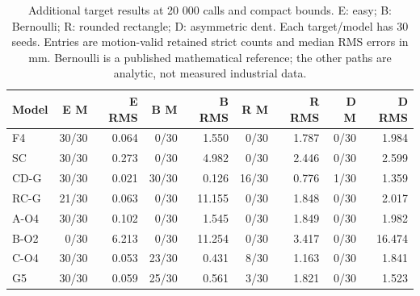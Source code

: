 \begin{table}[H]
\caption{Additional target results at 20 000 calls and compact bounds. E: easy; B: Bernoulli; R: rounded rectangle; D: asymmetric dent. Each target/model has 30 seeds. Entries are motion-valid retained strict counts and median RMS errors in mm. Bernoulli is a published mathematical reference; the other paths are analytic, not measured industrial data.}
\label{tab:v2_targets}
\centering
\small
\begin{tabular}{@{}lrrrrrrrr@{}}
\toprule
Model & E M & E RMS & B M & B RMS & R M & R RMS & D M & D RMS \\
\midrule
F4 & 30/30 & 0.064 & 0/30 & 1.550 & 0/30 & 1.787 & 0/30 & 1.984 \\
SC & 30/30 & 0.273 & 0/30 & 4.982 & 0/30 & 2.446 & 0/30 & 2.599 \\
CD-G & 30/30 & 0.021 & 30/30 & 0.126 & 16/30 & 0.776 & 1/30 & 1.359 \\
RC-G & 21/30 & 0.063 & 0/30 & 11.155 & 0/30 & 1.848 & 0/30 & 2.017 \\
A-O4 & 30/30 & 0.102 & 0/30 & 1.545 & 0/30 & 1.849 & 0/30 & 1.982 \\
B-O2 & 0/30 & 6.213 & 0/30 & 11.254 & 0/30 & 3.417 & 0/30 & 16.474 \\
C-O4 & 30/30 & 0.053 & 23/30 & 0.431 & 8/30 & 1.163 & 0/30 & 1.841 \\
G5 & 30/30 & 0.059 & 25/30 & 0.561 & 3/30 & 1.821 & 0/30 & 1.523 \\
\bottomrule
\end{tabular}
\end{table}

